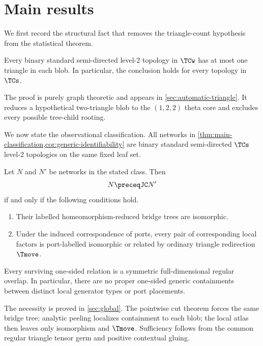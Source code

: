 \section{Main results}\label{sec:main-results}

We first record the structural fact that removes the triangle-count hypothesis from the statistical theorem.

\begin{theorem}\label{thm:automatic-triangle-bound}
Every binary standard semi-directed level-2 topology in $\TCw$ has at most one triangle in each blob.  In particular, the conclusion holds for every topology in $\TCs$.
\end{theorem}

The proof is purely graph theoretic and appears in \cref{sec:automatic-triangle}.  It reduces a hypothetical two-triangle blob to the $(1,2,2)$ theta core and excludes every possible tree-child rooting.

We now state the observational classification.  All networks in \cref{thm:main-classification,cor:generic-identifiability} are binary standard semi-directed $\TCs$ level-2 topologies on the same fixed leaf set.

\begin{theorem}\label{thm:main-classification}
Let $N$ and $N'$ be networks in the stated class.  Then
\[
N\preceqJC N'
\]
if and only if the following conditions hold.
\begin{enumerate}[label=\textup{(\alph*)}]
\item Their labelled homeomorphism-reduced bridge trees are isomorphic.
\item Under the induced correspondence of ports, every pair of corresponding local factors is port-labelled isomorphic or related by ordinary triangle redirection $\Tmove$.
\end{enumerate}
Every surviving one-sided relation is a symmetric full-dimensional regular overlap.  In particular, there are no proper one-sided generic containments between distinct local generator types or port placements.
\end{theorem}

The necessity is proved in \cref{sec:global}.  The pointwise cut theorem forces the same bridge tree; analytic peeling localizes containment to each blob; the local atlas then leaves only isomorphism and $\Tmove$.  Sufficiency follows from the common regular triangle tensor germ and positive contextual gluing.

